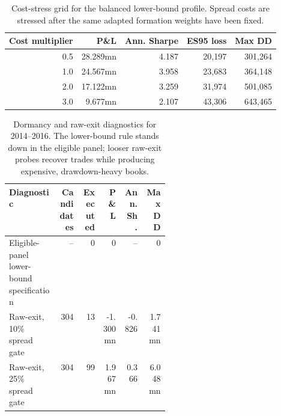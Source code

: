 \documentclass[11pt,a4paper]{amsart}
\newcommand{\tablecaptionskip}{\vspace{0.18em}}
\theoremstyle{plain}
\theoremstyle{definition}
\theoremstyle{remark}
\begin{document}
\begin{table}[H]
\centering
\caption{Cost-stress grid for the balanced lower-bound profile.  Spread costs are stressed after
the same adapted formation weights have been fixed.}
\tablecaptionskip
\begin{tabular}{rrrrr}
\toprule
Cost multiplier & P\&L & Ann. Sharpe & ES95 loss & Max DD\\
\midrule
0.5 & 28.289mn & 4.187 & 20,197 & 301,264\\
1.0 & 24.567mn & 3.958 & 23,683 & 364,148\\
2.0 & 17.122mn & 3.259 & 31,974 & 501,085\\
3.0 & 9.677mn & 2.107 & 43,306 & 643,465\\
\bottomrule
\end{tabular}
\label{tab:app-cost-stress}
\end{table}

\begin{table}[H]
\centering
\caption{Dormancy and raw-exit diagnostics for 2014--2016.  The lower-bound rule stands down in
the eligible panel; looser raw-exit probes recover trades while producing expensive, drawdown-heavy
books.}
\tablecaptionskip
\small
\begin{tabular}{@{}p{0.31\linewidth}rrrrr@{}}
\toprule
Diagnostic & Candidates & Executed & P\&L & Ann. Sh. & Max DD\\
\midrule
Eligible-panel lower-bound specification & -- & 0 & 0 & -- & 0\\
Raw-exit, 10\% spread gate & 304 & 13 & -1.300mn & -0.826 & 1.741mn\\
Raw-exit, 25\% spread gate & 304 & 99 & 1.967mn & 0.366 & 6.048mn\\
\bottomrule
\end{tabular}
\label{tab:app-dormancy}
\end{table}

\clearpage



\end{document}
